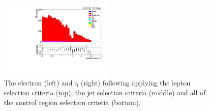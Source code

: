 \begin{figure}[ht]
\includegraphics[width=0.49\textwidth]{figs/background-estimation/plots/unblinded/ttbar_control/lep1Eta_SingleTop_wMass_emu.pdf}
\caption{
The electron \pT (left) and $\eta$ (right) following applying the lepton selection criteria (top), the jet selection criteria (middle) and all of the \ttbar control region selection criteria (bottom).
}
\label{fig:ttbar_electron}
\end{figure}

